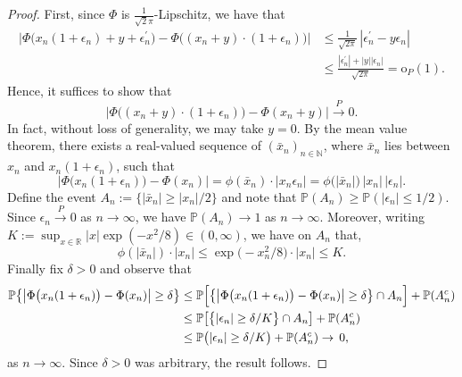 \documentclass[12pt]{article}
\begin{document}
    \begin{proof}
        First, since $\Phi$ is $\frac{1}{\sqrt 2\pi}$-Lipschitz, we have that 
        \begin{align*}
            \bigl|\Phi\bigl(x_n(1+\epsilon_n)+y+\epsilon_n^\prime\bigr)-\Phi\bigl((x_n+y)\cdot(1+\epsilon_n)\bigr)\bigr|&\leq \frac{1}{\sqrt{2\pi}}\,|\epsilon_n^\prime-y\epsilon_n|\\
            &\leq \frac{|\epsilon_n^\prime|+|y||\epsilon_n|}{\sqrt{2\pi}}=\mathrm{o}_P(1).
        \end{align*}
        Hence, it suffices to show that 
    \[
    \bigl|\Phi\bigl((x_n+y)\cdot(1+\epsilon_n)\bigr)-\Phi(x_n+y)\bigr|\overset{P}{\to} 0.
        \]
        In fact, without loss of generality, we may take $y=0$.
         By the mean value theorem, there exists a real-valued sequence of $(\bar{x}_n)_{n\in \mathbb{N}}$, where $\bar{x}_n$ lies between $x_n$ and $x_n(1+\epsilon_n)$, such that 
        \[
            \bigl|\Phi\bigl(x_n(1+\epsilon_n)\bigr)-\Phi(x_n)\bigr|=\phi(\bar{x}_n) \cdot |x_n\epsilon_n|=\phi\bigl(|\bar{x}_n|\bigr) \,|x_n|\,|\epsilon_n|.
        \]
        Define the event $A_n:=\bigl\{|\bar{x}_n|\geq |x_n|/2\bigr\}$
        and note that $\mathbb{P}(A_n) \geq \mathbb{P}(|\epsilon_n|\leq 1/2)$. Since $\epsilon_n\overset{P}{\to} 0$ as $n\to \infty$, we have $\mathbb{P}(A_n)\to 1$ as $n\to\infty$. Moreover, writing $K := \sup_{x \in \mathbb{R}} |x|\exp(-x^2/8) \in (0,\infty)$, we have on $A_n$ that,
        \[
        \phi(|\bar{x}_n|)\cdot |x_n|\leq \exp\bigl(-x_n^2/8\bigr)\cdot |x_n|\leq K.
        \]
        Finally fix $\delta>0$ and observe that
        \begin{align*}
            \mathbb{P}\bigl\{\bigl|\Phi\bigl(x_n(1+\epsilon_n)\bigr)-\Phi(x_n)\bigr| \geq \delta\bigr\} &\leq \mathbb{P}\Bigl[\bigl\{\bigl|\Phi\bigl(x_n(1+\epsilon_n)\bigr)-\Phi(x_n)\bigr|\geq \delta\bigr\}\cap A_n\Bigr] + \mathbb{P}(A_n^c) \\    
            &\leq \mathbb{P}\bigl[\bigl\{|\epsilon_n|\geq \delta/K\bigr\}\cap A_n\bigr] + \mathbb{P}(A_n^c)\\
            &\leq \mathbb{P}\bigl(|\epsilon_n|\geq \delta/K\bigr) + \mathbb{P}(A_n^c)\to\,0,
            \end{align*}
            as $n\to\infty$. Since $\delta > 0$ was arbitrary, the result follows.        
\end{proof}
\end{document}
